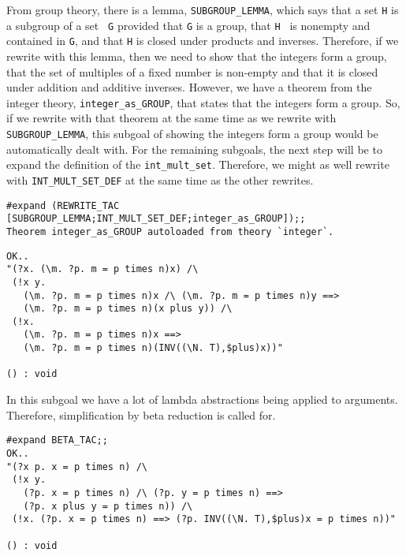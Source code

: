 From group theory, there is a lemma, {\small\verb+SUBGROUP_LEMMA+},
which says that a set {\small\tt H} is a subgroup of a set {\small\tt
G} provided that {\small\tt G} is a group, that {\small\tt H } is nonempty
and contained in {\small\tt G}, and that {\small\tt H} is closed under
products and inverses.  Therefore, if we rewrite with this lemma, then
we need to show that the integers form a group, that the set of
multiples of a fixed number is non-empty and that it is closed under
addition and additive inverses.  However, we have a theorem from the
integer theory, {\small\verb+integer_as_GROUP+}, that states that
the integers form a group.  So, if we rewrite with that theorem at the
same time as we rewrite with {\small\verb+SUBGROUP_LEMMA+}, this
subgoal of showing the integers form a group would be automatically
dealt with.  For the remaining subgoals, the next step will be to expand
the definition of the {\small\verb+int_mult_set+}.  Therefore, we
might as well rewrite with {\small\verb+INT_MULT_SET_DEF+} at the same
time as the other rewrites.
\begin{session}
\begin{verbatim}
#expand (REWRITE_TAC [SUBGROUP_LEMMA;INT_MULT_SET_DEF;integer_as_GROUP]);;
Theorem integer_as_GROUP autoloaded from theory `integer`.
\end{verbatim}
\mvdots
\begin{verbatim}
OK..
"(?x. (\m. ?p. m = p times n)x) /\
 (!x y.
   (\m. ?p. m = p times n)x /\ (\m. ?p. m = p times n)y ==>
   (\m. ?p. m = p times n)(x plus y)) /\
 (!x.
   (\m. ?p. m = p times n)x ==>
   (\m. ?p. m = p times n)(INV((\N. T),$plus)x))"

() : void
\end{verbatim}
\end{session}

In this subgoal we have a lot of lambda abstractions being applied
to arguments.  Therefore, simplification by beta reduction is called
for.
\begin{session}
\begin{verbatim}
#expand BETA_TAC;;
OK..
"(?x p. x = p times n) /\
 (!x y.
   (?p. x = p times n) /\ (?p. y = p times n) ==>
   (?p. x plus y = p times n)) /\
 (!x. (?p. x = p times n) ==> (?p. INV((\N. T),$plus)x = p times n))"

() : void
\end{verbatim}
\end{session}

